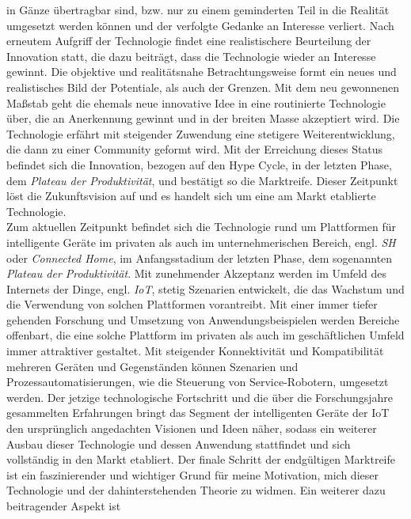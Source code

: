     in Gänze übertragbar sind, bzw. nur zu einem geminderten Teil in die Realität umgesetzt werden können 
    und der verfolgte Gedanke an Interesse verliert. Nach erneutem Aufgriff der Technologie findet eine realistischere 
    Beurteilung der Innovation statt, die dazu beiträgt, dass die Technologie wieder an Interesse gewinnt. Die 
    objektive und realitätsnahe Betrachtungsweise formt ein neues und realistisches Bild der Potentiale, als auch 
    der Grenzen. Mit dem neu gewonnenen Maßstab geht die ehemals neue innovative Idee in eine routinierte Technologie über, 
    die an Anerkennung gewinnt und in der breiten Masse akzeptiert wird. Die Technologie erfährt mit steigender 
    Zuwendung eine stetigere Weiterentwicklung, die dann zu einer Community geformt wird. Mit der Erreichung dieses Status 
    befindet sich die Innovation, bezogen auf den Hype Cycle, in der letzten Phase, dem \textit{Plateau der Produktivität}, 
    und bestätigt so die Marktreife. Dieser Zeitpunkt löst die Zukunftsvision auf und es handelt sich um eine am Markt 
    etablierte Technologie.
    \\ 
    \linebreak
    Zum aktuellen Zeitpunkt befindet sich die Technologie rund um Plattformen für intelligente Geräte im privaten als auch im unternehmerischen 
    Bereich, engl. \textit{\ac{SH}} oder \textit{Connected Home}, im Anfangsstadium der letzten Phase, dem sogenannten 
    \textit{Plateau der Produktivität}. Mit zunehmender Akzeptanz werden im Umfeld des Internets der Dinge, engl. 
    \textit{\acl{IoT}}, stetig Szenarien entwickelt, die das Wachstum und die Verwendung von solchen Plattformen vorantreibt. 
    Mit einer immer tiefer gehenden Forschung und Umsetzung von Anwendungsbeispielen werden Bereiche offenbart, die 
    eine solche Plattform im privaten als auch im geschäftlichen Umfeld immer attraktiver gestaltet. Mit steigender  
    Konnektivität und Kompatibilität mehreren Geräten und Gegenständen können Szenarien und Prozessautomatisierungen, wie die 
    Steuerung von Service-Robotern, umgesetzt werden. Der jetzige technologische Fortschritt und die über die Forschungsjahre 
    gesammelten Erfahrungen bringt das Segment der intelligenten Geräte der \acs{IoT} den ursprünglich angedachten 
    Visionen und Ideen näher, sodass ein weiterer Ausbau dieser Technologie und dessen Anwendung stattfindet und sich 
    vollständig in den Markt etabliert. Der finale Schritt der endgültigen Marktreife ist ein faszinierender und wichtiger Grund 
    für meine Motivation, mich dieser Technologie und der dahinterstehenden Theorie zu widmen. Ein weiterer dazu beitragender Aspekt ist 
